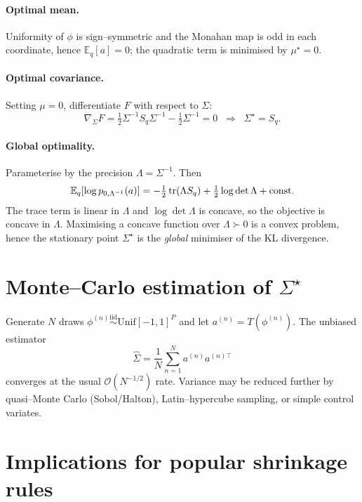 \documentclass[11pt]{article}
\begin{document}
\paragraph{Optimal mean.}
Uniformity of $\phi$ is sign--symmetric and the Monahan map is odd in
each coordinate, hence $\mathbb E_q[a]=0$; the quadratic term is
minimised by
\(
  \boxed{\mu^\star=0}.
\)

\paragraph{Optimal covariance.}
Setting $\mu=0$, differentiate $F$ with respect to $\Sigma$:
\[
  \nabla_\Sigma F
  =\tfrac12\Sigma^{-1}S_q\Sigma^{-1}-\tfrac12\Sigma^{-1}=0
  \;\;\Longrightarrow\;\;
  \boxed{\Sigma^\star=S_q}.
\]

\paragraph{Global optimality.}
Parameterise by the precision $\Lambda=\Sigma^{-1}$.  Then
\[
  \mathbb E_q[\log p_{0,\Lambda^{-1}}(a)]
  =-\tfrac12\,\mathrm{tr}(\Lambda S_q)+\tfrac12\log\det\Lambda+{\rm const.}
\]
The trace term is linear in $\Lambda$ and $\log\det\Lambda$ is concave,
so the objective is concave in $\Lambda$.  Maximising a concave
function over $\Lambda\succ0$ is a convex problem, hence the stationary
point $\Sigma^\star$ is the \emph{global} minimiser of the KL
divergence.\vspace{6pt}


\section{Monte--Carlo estimation of $\Sigma^\star$}

Generate $N$ draws
$\phi^{(n)}\stackrel{\text{iid}}{\sim}\mathrm{Unif}[-1,1]^P$ and let
$a^{(n)}=T(\phi^{(n)})$.  The unbiased estimator
\[
  \widehat\Sigma
  =\frac1N\sum_{n=1}^{N}a^{(n)}a^{(n)\top}
\]
converges at the usual $\mathcal O(N^{-1/2})$ rate.  Variance may be
reduced further by quasi--Monte Carlo (Sobol/Halton), Latin--hypercube
sampling, or simple control variates.\vspace{4pt}


\section{Implications for popular shrinkage rules}
\end{document}
